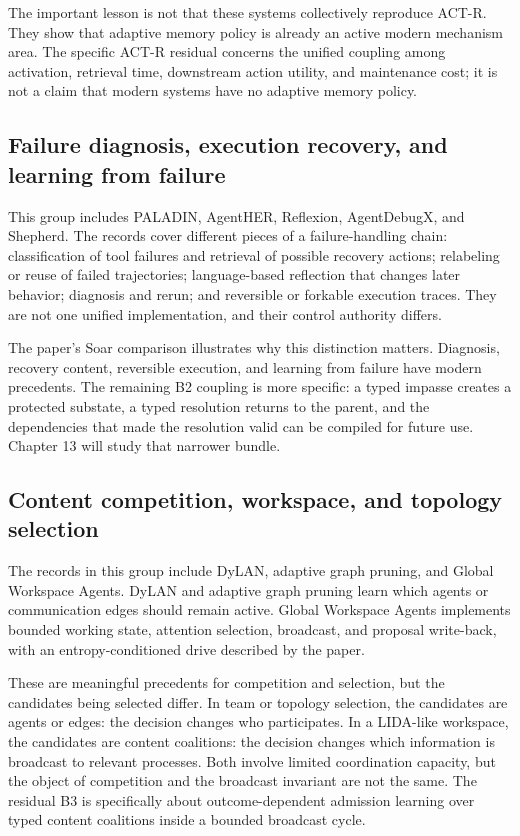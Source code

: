 The important lesson is not that these systems collectively reproduce ACT-R. They show that adaptive memory policy is already an active modern mechanism area. The specific ACT-R residual concerns the unified coupling among activation, retrieval time, downstream action utility, and maintenance cost; it is not a claim that modern systems have no adaptive memory policy.

\subsection{Failure diagnosis, execution recovery, and learning from failure}

This group includes PALADIN, AgentHER, Reflexion, AgentDebugX, and Shepherd. The records cover different pieces of a failure-handling chain: classification of tool failures and retrieval of possible recovery actions; relabeling or reuse of failed trajectories; language-based reflection that changes later behavior; diagnosis and rerun; and reversible or forkable execution traces. They are not one unified implementation, and their control authority differs.

The paper's Soar comparison illustrates why this distinction matters. Diagnosis, recovery content, reversible execution, and learning from failure have modern precedents. The remaining B2 coupling is more specific: a typed impasse creates a protected substate, a typed resolution returns to the parent, and the dependencies that made the resolution valid can be compiled for future use. Chapter 13 will study that narrower bundle.

\subsection{Content competition, workspace, and topology selection}

The records in this group include DyLAN, adaptive graph pruning, and Global Workspace Agents. DyLAN and adaptive graph pruning learn which agents or communication edges should remain active. Global Workspace Agents implements bounded working state, attention selection, broadcast, and proposal write-back, with an entropy-conditioned drive described by the paper.

These are meaningful precedents for competition and selection, but the candidates being selected differ. In team or topology selection, the candidates are agents or edges: the decision changes who participates. In a LIDA-like workspace, the candidates are content coalitions: the decision changes which information is broadcast to relevant processes. Both involve limited coordination capacity, but the object of competition and the broadcast invariant are not the same. The residual B3 is specifically about outcome-dependent admission learning over typed content coalitions inside a bounded broadcast cycle.

